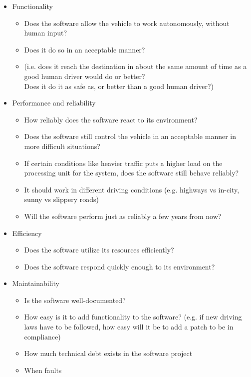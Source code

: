 \documentclass[letterpaper]{article}
\begin{document}
\begin{itemize}
	\item Functionality
		
	\begin{itemize}
		\item Does the software allow the vehicle to work autonomously, without human input? 
		\item Does it do so in an acceptable manner? 
		\item (i.e. does it reach the destination in about the same amount of time as a good human driver would do or better?\\
		 Does it do it as safe as, or better than a good human driver?)
	\end{itemize}
	\item Performance and reliability
	\begin{itemize}
		\item How reliably does the software react to its environment?
		\item Does the software still control the vehicle in an acceptable manner in more difficult situations?
		\item If certain conditions like heavier traffic puts a higher load on the processing unit for the system, does the software still behave reliably?
		\item It should work in different driving conditions (e.g. highways vs in-city, sunny vs slippery roads)
		\item Will the software perform just as reliably a few years from now?
	\end{itemize}
		\item Efficiency
	\begin{itemize}
		\item Does the software utilize its resources efficiently?
		\item Does the software respond quickly enough to its environment?
	\end{itemize}
	\item Maintainability
	\begin{itemize}	
	\item Is the software well-documented?
		\item How easy is it to add functionality to the software? (e.g. if new driving laws have to be followed, how easy will it be to add a patch to be in compliance)
		\item How much technical debt exists in the software project
		\item When faults

\end{itemize}
\end{itemize}
\end{document}
